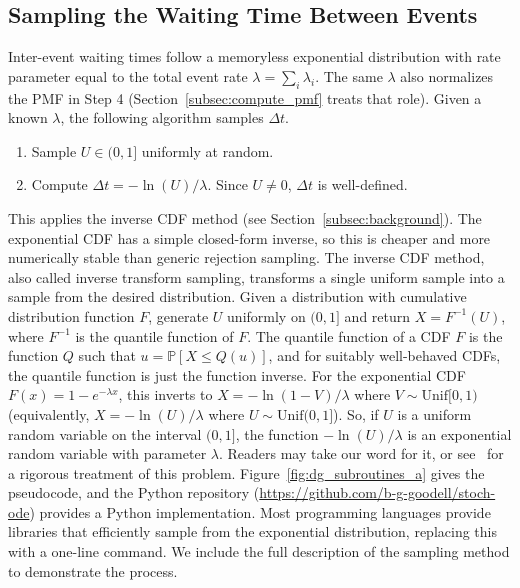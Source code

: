 \subsection{Sampling the Waiting Time Between Events}\label{subsec:wait_time}


Inter-event waiting times follow a memoryless exponential distribution with rate parameter equal to the total event rate $\lambda = \sum_i \lambda_i$. The same $\lambda$ also normalizes the PMF in Step 4 (Section~\ref{subsec:compute_pmf} treats that role). Given a known $\lambda$, the following algorithm samples $\Delta t$.

\begin{enumerate}
\item Sample $U \in (0, 1]$ uniformly at random.
\item Compute $\Delta t = -\ln(U)/\lambda$. Since $U \neq 0$, $\Delta t$ is well-defined.
\end{enumerate}

This applies the inverse CDF method (see Section~\ref{subsec:background}).
The exponential CDF has a simple closed-form inverse, so this is cheaper and more numerically stable than generic rejection sampling.
The inverse CDF method, also called inverse transform sampling, transforms a single uniform sample into a sample from the desired distribution.
Given a distribution with cumulative distribution function $F$, generate $U$ uniformly on $(0, 1]$ and return $X = F^{-1}(U)$, where $F^{-1}$ is the quantile function of $F$.
The quantile function of a CDF $F$ is the function $Q$ such that $u=\mathbb{P}\left[X \leq Q(u)\right]$, and for suitably well-behaved CDFs, the quantile function is just the function inverse.
For the exponential CDF $F(x) = 1 - e^{-\lambda x}$, this inverts to $X = -\ln(1 - V)/\lambda$ where $V \sim \text{Unif}[0,1)$ (equivalently, $X = -\ln(U)/\lambda$ where $U \sim \text{Unif}(0,1]$).
So, if $U$ is a uniform random variable on the interval $(0,1]$, the function $-\ln(U)/\lambda$ is an exponential random variable with parameter $\lambda$.
Readers may take our word for it, or see~\cite{grimmett2020probability} for a rigorous treatment of this problem.
Figure~\ref{fig:dg_subroutines_a} gives the pseudocode, and the Python repository (\url{https://github.com/b-g-goodell/stoch-ode}) provides a Python implementation.
Most programming languages provide libraries that efficiently sample from the exponential distribution, replacing this with a one-line command.
We include the full description of the sampling method to demonstrate the process.%
